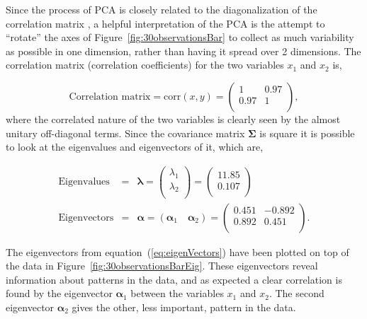Since the process of PCA is closely related to the diagonalization of the correlation matrix \citep[p. 174]{Therrien1992}, a helpful interpretation of the PCA is the attempt to ``rotate'' the axes of Figure~\ref{fig:30observationsBar} to collect as much variability as possible in one dimension, rather than having it spread over 2 dimensions. The correlation matrix (correlation coefficients) for the two variables $x_1$ and $x_2$ is,

\begin{equation}\label{eq:corrcoef}
\textrm{Correlation matrix} = \textrm{corr}(x,y)= \left(
    \begin{array}{cc}
        1   & 0.97 \\
        0.97& 1    \\
    \end{array}\right),
\end{equation}
where the correlated nature of the two variables is clearly seen by the almost unitary off-diagonal terms. Since the covariance matrix $\boldsymbol\Sigma$ is square it is possible to look at the eigenvalues and eigenvectors of it, which are,

\begin{eqnarray}\label{eq:eigValues}
\textrm{Eigenvalues} &=& \boldsymbol\lambda = \left(
    \begin{array}{c}
        \lambda_1 \\
        \lambda_2 \\
    \end{array}\right) = \left(
    \begin{array}{c}
        11.85 \\
        0.107 \\
    \end{array}\right)\\\label{eq:eigenVectors}
    \textrm{Eigenvectors} &=& \boldsymbol\alpha = \left( \boldsymbol\alpha_1 \quad \boldsymbol\alpha_2\right) =\left(
    \begin{array}{cc}
         0.451 & -0.892  \\
         0.892 & 0.451   \\
    \end{array}\right).
\end{eqnarray}

The eigenvectors from equation~(\ref{eq:eigenVectors}) have been plotted on top of the data in Figure~\ref{fig:30observationsBarEig}. These eigenvectors reveal information about patterns in the data, and as expected a clear correlation is found by the eigenvector $\boldsymbol\alpha_1$ between the variables $x_1$ and $x_2$. The second eigenvector $\boldsymbol\alpha_2$ gives the other, less important, pattern in the data.


